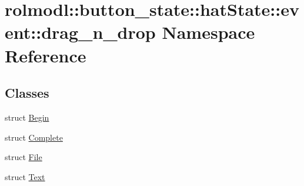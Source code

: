 \hypertarget{namespacerolmodl_1_1button__state_1_1hat_state_1_1event_1_1drag__n__drop}{}\section{rolmodl\+::button\+\_\+state\+::hat\+State\+::event\+::drag\+\_\+n\+\_\+drop Namespace Reference}
\label{namespacerolmodl_1_1button__state_1_1hat_state_1_1event_1_1drag__n__drop}
\subsection*{Classes}
\begin{DoxyCompactItemize}
\item 
struct \mbox{\hyperlink{structrolmodl_1_1button__state_1_1hat_state_1_1event_1_1drag__n__drop_1_1_begin}{Begin}}
\item 
struct \mbox{\hyperlink{structrolmodl_1_1button__state_1_1hat_state_1_1event_1_1drag__n__drop_1_1_complete}{Complete}}
\item 
struct \mbox{\hyperlink{structrolmodl_1_1button__state_1_1hat_state_1_1event_1_1drag__n__drop_1_1_file}{File}}
\item 
struct \mbox{\hyperlink{structrolmodl_1_1button__state_1_1hat_state_1_1event_1_1drag__n__drop_1_1_text}{Text}}
\end{DoxyCompactItemize}
